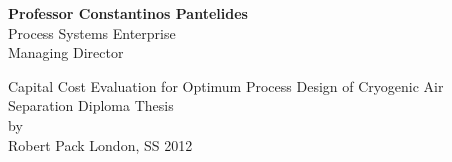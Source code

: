 \begin{minipage}[b]{8.5cm}
	\begin{flushleft}
	\end{flushleft}
\end{minipage}
\hfill
\begin{minipage}[b]{7.5cm}
	\begin{flushleft}
		\textcolor{PSEGreen}{
		\textbf{Professor Constantinos Pantelides} \\ Process Systems Enterprise \\ Managing Director}
	\end{flushleft}
\end{minipage}



\begin{center}
	\vspace{3cm}
	 \Huge  Capital Cost Evaluation for Optimum Process Design of Cryogenic Air Separation
	\vspace{1cm}
	 \vfill \LARGE
	{Diploma Thesis\\
	by\\
	Robert Pack} \vfill{London, SS 2012}
\end{center}

